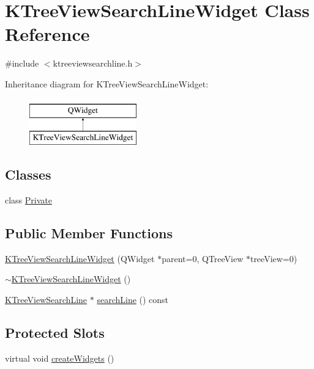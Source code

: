 \hypertarget{classKTreeViewSearchLineWidget}{\section{K\+Tree\+View\+Search\+Line\+Widget Class Reference}
\label{classKTreeViewSearchLineWidget}
}


{\ttfamily \#include $<$ktreeviewsearchline.\+h$>$}

Inheritance diagram for K\+Tree\+View\+Search\+Line\+Widget\+:\begin{figure}[H]
\begin{center}
\leavevmode
\includegraphics[height=2.000000cm]{classKTreeViewSearchLineWidget}
\end{center}
\end{figure}
\subsection*{Classes}
\begin{DoxyCompactItemize}
\item 
class \hyperlink{classKTreeViewSearchLineWidget_1_1Private}{Private}
\end{DoxyCompactItemize}
\subsection*{Public Member Functions}
\begin{DoxyCompactItemize}
\item 
\hyperlink{classKTreeViewSearchLineWidget_ab6d680bcfc19556e09065637fc090d4e}{K\+Tree\+View\+Search\+Line\+Widget} (Q\+Widget $\ast$parent=0, Q\+Tree\+View $\ast$tree\+View=0)
\item 
\hyperlink{classKTreeViewSearchLineWidget_aaca99f2fb80ed5fed34bbf3180acbf6b}{$\sim$\+K\+Tree\+View\+Search\+Line\+Widget} ()
\item 
\hyperlink{classKTreeViewSearchLine}{K\+Tree\+View\+Search\+Line} $\ast$ \hyperlink{classKTreeViewSearchLineWidget_a6acf84ca5f93a184b0ca8e671be46361}{search\+Line} () const 
\end{DoxyCompactItemize}
\subsection*{Protected Slots}
\begin{DoxyCompactItemize}
\item 
virtual void \hyperlink{classKTreeViewSearchLineWidget_a7ddb446e43781ac5522b037808fc221c}{create\+Widgets} ()
\end{DoxyCompactItemize}
